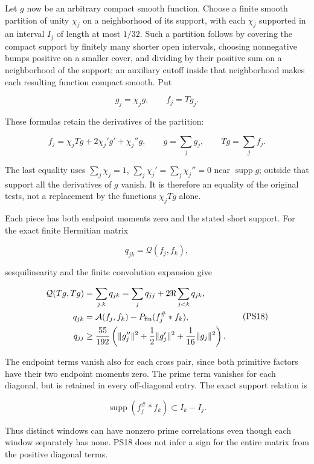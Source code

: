 \documentclass[
  10pt,
  a4paper,
]{article}
\newcounter{none} %
\begin{document}
Let \(g\) now be an arbitrary compact smooth function. Choose a finite
smooth partition of unity \(\chi_j\) on a neighborhood of its support,
with each \(\chi_j\) supported in an interval \(I_j\) of length at most
\(1/32\). Such a partition follows by covering the compact support by
finitely many shorter open intervals, choosing nonnegative bumps
positive on a smaller cover, and dividing by their positive sum on a
neighborhood of the support; an auxiliary cutoff inside that
neighborhood makes each resulting function compact smooth. Put

\[
g_j=\chi_jg,\qquad f_j=Tg_j.
\tag{PS16}
\]

These formulas retain the derivatives of the partition:

\[
f_j=\chi_jTg+2\chi_j'g'+\chi_j''g,
\qquad g=\sum_jg_j,\qquad Tg=\sum_jf_j.
\tag{PS17}
\]

The last equality uses \(\sum_j\chi_j=1\),
\(\sum_j\chi_j'=\sum_j\chi_j''=0\) near \(\operatorname{supp}g\);
outside that support all the derivatives of \(g\) vanish. It is
therefore an equality of the original tests, not a replacement by the
functions \(\chi_jTg\) alone.

Each piece has both endpoint moments zero and the stated short support.
For the exact finite Hermitian matrix

\[
q_{jk}=\mathcal Q(f_j,f_k),
\]

sesquilinearity and the finite convolution expansion give

\[
\begin{split}
\mathcal Q(Tg,Tg)
&=\sum_{j,k}q_{jk}
=\sum_j q_{jj}+2\Re\sum_{j<k}q_{jk},\\
q_{jk}
&=\mathcal A(f_j,f_k)-P_{\rm fin}(f_j^\#*f_k),\\
q_{jj}
&\ge\frac{55}{192}
\left(\|g_j''\|^2+\frac12\|g_j'\|^2
+\frac1{16}\|g_j\|^2\right).
\end{split}
\tag{PS18}
\]

The endpoint terms vanish also for each cross pair, since both primitive
factors have their two endpoint moments zero. The prime term vanishes
for each diagonal, but is retained in every off-diagonal entry. The
exact support relation is

\[
\operatorname{supp}(f_j^\#*f_k)\subset I_k-I_j.
\tag{PS19}
\]

Thus distinct windows can have nonzero prime correlations even though
each window separately has none. PS18 does not infer a sign for the
entire matrix from the positive diagonal terms.
\end{document}
